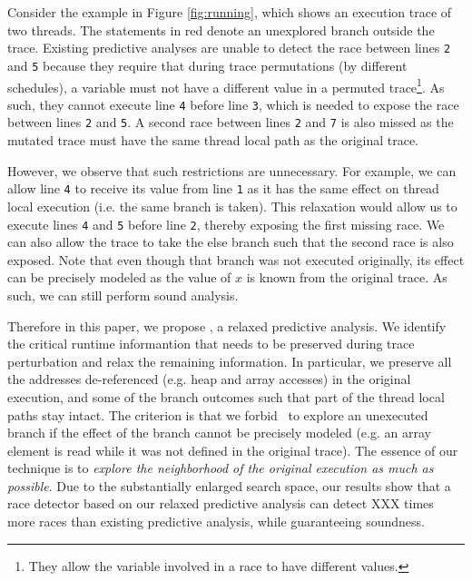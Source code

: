 Consider the example in Figure \ref{fig:running}, which shows an execution trace of two threads. The statements in red 
denote an unexplored branch outside the trace. Existing predictive analyses are unable to detect the race between 
lines {\tt 2} and {\tt 5} because they require that during trace permutations (by different schedules), a variable must not have
a different value in a permuted trace\footnote{They allow the variable involved in a race to have different values.}.
As such, they cannot execute line {\tt 4} before line {\tt 3}, which is needed to expose the race between lines {\tt 2}
and {\tt 5}. 
A second race between lines {\tt 2} and {\tt 7} is also missed as the mutated trace must have the same thread local
path as the original trace. 

However, we observe that such restrictions are unnecessary. For example, we can allow line {\tt 4} to receive its
value from line {\tt 1} as it has the same effect on thread local execution (i.e. the same branch is taken). 
This relaxation would allow us to execute lines {\tt 4} and {\tt 5} before line {\tt 2}, thereby exposing 
the first missing race. We can also allow the trace to take the else branch such that the second race is also exposed. 
Note that even though that branch was not executed originally, its effect can be precisely modeled as the value 
of $x$ is known from the original trace. As such, we can still perform sound analysis.

Therefore in this paper, we propose \sysname, a relaxed predictive analysis. We identify the critical runtime
informantion that needs to be preserved during trace perturbation and relax the remaining information. 
In particular, we preserve all the addresses de-referenced (e.g. heap and array accesses) in the original execution,
and some of the branch outcomes such that part of the thread local paths stay intact. The criterion is that
we forbid \sysname\ to explore an unexecuted branch if the effect of the branch cannot be precisely modeled
(e.g. an array element is read while it was not defined in the original trace). The essence of our technique 
is to {\em explore the neighborhood of the original execution as much as possible}. Due to the substantially
enlarged search space, our results show that a race detector based on our relaxed predictive analysis 
can detect XXX times more races than existing predictive analysis, while guaranteeing soundness. 

